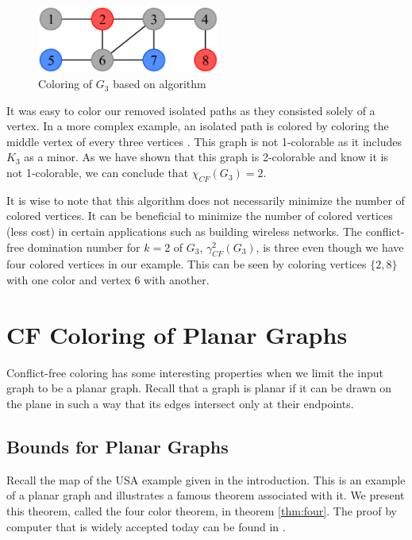 \documentclass{sig-alternate}
\begin{document}
\begin{figure}[h]
	\centering
	\includegraphics[width=6cm]{../figures/algorithm1-step3.pdf}
	\caption{Coloring of $G_3$ based on algorithm}\label{fig:algorithm1-step3}
\end{figure}

It was easy to color our removed isolated paths as they consisted solely of a vertex. In a more complex example, an isolated path is colored by coloring the middle vertex of every three vertices \cite{abel2017three}. This graph is not 1-colorable as it includes $K_3$ as a minor. As we have shown that this graph is 2-colorable and know it is not 1-colorable, we can conclude that $\chi_{CF}(G_3) = 2$.

It is wise to note that this algorithm does not necessarily minimize the number of colored vertices. It can be beneficial to minimize the number of colored vertices (less cost) in certain applications such as building wireless networks. The conflict-free domination number for $k=2$ of $G_3$, $\gamma_{CF}^2(G_3)$, is three even though we have four colored vertices in our example. This can be seen by coloring vertices $\{2, 8\}$ with one color and vertex 6 with another.

\section{CF Coloring of Planar Graphs}
\label{sec:planar-coloring}
Conflict-free coloring has some interesting properties when we limit the input graph to be a planar graph. Recall that a graph is planar if it can be drawn on the plane in such a way that its edges intersect only at their endpoints.

\subsection{Bounds for Planar Graphs}
\label{sec:bounds}
Recall the map of the USA example given in the introduction. This is an example of a planar graph and illustrates a famous theorem associated with it. We present this theorem, called the four color theorem, in theorem \ref{thm:four}. The proof by computer that is widely accepted today can be found in \cite{robertson1997four}.
\end{document}
